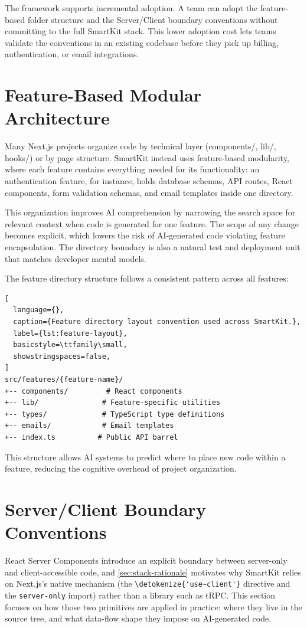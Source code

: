 \documentclass[12pt,a4paper]{report}
\newcommand{\code}[1]{\texttt{\nolinkurl{\detokenize{#1}}}}
\newcommand{\pkg}[1]{\texttt{\nolinkurl{#1}}}
\newcommand{\usec}{\code{'use~client'}}
\begin{document}
The framework supports incremental adoption. A team can adopt the feature-based folder structure and the Server/Client boundary conventions without committing to the full SmartKit stack. This lower adoption cost lets teams validate the conventions in an existing codebase before they pick up billing, authentication, or email integrations.

\section{Feature-Based Modular Architecture}

Many Next.js projects organize code by technical layer (components/, lib/, hooks/) or by page structure. SmartKit instead uses feature-based modularity, where each feature contains everything needed for its functionality: an authentication feature, for instance, holds database schemas, API routes, React components, form validation schemas, and email templates inside one directory.

This organization improves AI comprehension by narrowing the search space for relevant context when code is generated for one feature. The scope of any change becomes explicit, which lowers the risk of AI-generated code violating feature encapsulation. The directory boundary is also a natural test and deployment unit that matches developer mental models.

The feature directory structure follows a consistent pattern across all features:

\begin{lstlisting}[
  language={},
  caption={Feature directory layout convention used across SmartKit.},
  label={lst:feature-layout},
  basicstyle=\ttfamily\small,
  showstringspaces=false,
]
src/features/{feature-name}/
+-- components/         # React components
+-- lib/               # Feature-specific utilities
+-- types/             # TypeScript type definitions
+-- emails/            # Email templates
+-- index.ts          # Public API barrel
\end{lstlisting}

This structure allows AI systems to predict where to place new code within a feature, reducing the cognitive overhead of project organization.

\section{Server/Client Boundary Conventions}

React Server Components introduce an explicit boundary between server-only and client-accessible code, and \autoref{sec:stack-rationale} motivates why SmartKit relies on Next.js's native mechanism (the \usec{} directive and the \pkg{server-only} import) rather than a library such as tRPC. This section focuses on how those two primitives are applied in practice: where they live in the source tree, and what data-flow shape they impose on AI-generated code.
\end{document}
